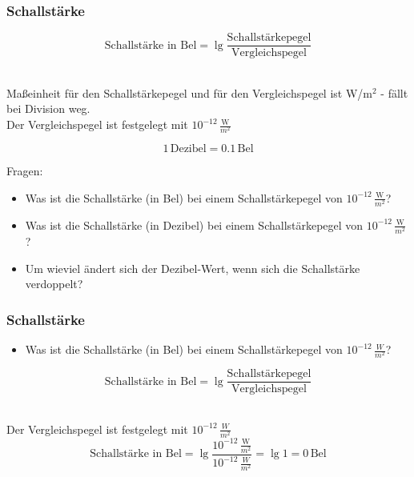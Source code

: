\documentclass{beamer}
\begin{document}
\begin{frame}
\frametitle{Schallstärke}

\[
\text{Schallstärke in Bel} = \lg \frac{\text{Schallstärkepegel}}{\text{Vergleichspegel}} 
\]

$\,$\\

Maßeinheit für den Schallstärkepegel und für den Vergleichspegel ist W/m$^2$ - fällt bei Division weg.  \\

Der Vergleichspegel ist festgelegt mit \(10^{-12}\,\frac{\text{W}}{m^2}\) \\

\pause

\[1\,\text{Dezibel} = 0.1\,\text{Bel}\]

\pause

Fragen:
\begin{itemize}
\item
Was ist die Schallstärke (in Bel) bei einem Schallstärkepegel von \(10^{-12}\,\frac{\text{W}}{m^2}\)?
\item
Was ist die Schallstärke (in Dezibel) bei einem Schallstärkepegel von \(10^{-12}\,\frac{\text{W}}{m^2}\)?
\item
Um wieviel ändert sich der Dezibel-Wert, wenn sich die Schallstärke verdoppelt?
\end{itemize}



\end{frame}



\begin{frame}
\frametitle{Schallstärke}

\begin{itemize}
\item
Was ist die Schallstärke (in Bel) bei einem Schallstärkepegel von \(10^{-12}\,\frac{W}{m^2}\)?

\end{itemize}


\[
\text{Schallstärke in Bel} = \lg \frac{\text{Schallstärkepegel}}{\text{Vergleichspegel}} 
\]

$\,$\\

Der Vergleichspegel ist festgelegt mit \(10^{-12}\,\frac{W}{m^2}\) \\


\[
\text{Schallstärke in Bel} = \lg \frac{10^{-12}\,\frac{\text{W}}{m^2}}{10^{-12}\,\frac{W}{m^2}}  = \lg 1 = 0\,\text{Bel}
\]




\end{frame}
\end{document}

